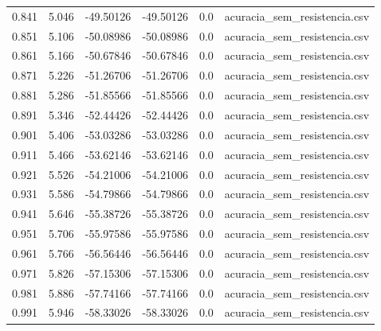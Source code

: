 \begin{table}
\begin{tabular}{llllll}
0.841 & 5.046 & -49.50126 & -49.50126 & 0.0 & acuracia\_sem\_resistencia.csv \\
0.851 & 5.106 & -50.08986 & -50.08986 & 0.0 & acuracia\_sem\_resistencia.csv \\
0.861 & 5.166 & -50.67846 & -50.67846 & 0.0 & acuracia\_sem\_resistencia.csv \\
0.871 & 5.226 & -51.26706 & -51.26706 & 0.0 & acuracia\_sem\_resistencia.csv \\
0.881 & 5.286 & -51.85566 & -51.85566 & 0.0 & acuracia\_sem\_resistencia.csv \\
0.891 & 5.346 & -52.44426 & -52.44426 & 0.0 & acuracia\_sem\_resistencia.csv \\
0.901 & 5.406 & -53.03286 & -53.03286 & 0.0 & acuracia\_sem\_resistencia.csv \\
0.911 & 5.466 & -53.62146 & -53.62146 & 0.0 & acuracia\_sem\_resistencia.csv \\
0.921 & 5.526 & -54.21006 & -54.21006 & 0.0 & acuracia\_sem\_resistencia.csv \\
0.931 & 5.586 & -54.79866 & -54.79866 & 0.0 & acuracia\_sem\_resistencia.csv \\
0.941 & 5.646 & -55.38726 & -55.38726 & 0.0 & acuracia\_sem\_resistencia.csv \\
0.951 & 5.706 & -55.97586 & -55.97586 & 0.0 & acuracia\_sem\_resistencia.csv \\
0.961 & 5.766 & -56.56446 & -56.56446 & 0.0 & acuracia\_sem\_resistencia.csv \\
0.971 & 5.826 & -57.15306 & -57.15306 & 0.0 & acuracia\_sem\_resistencia.csv \\
0.981 & 5.886 & -57.74166 & -57.74166 & 0.0 & acuracia\_sem\_resistencia.csv \\
0.991 & 5.946 & -58.33026 & -58.33026 & 0.0 & acuracia\_sem\_resistencia.csv \\
\bottomrule
\end{tabular}
\end{table}
